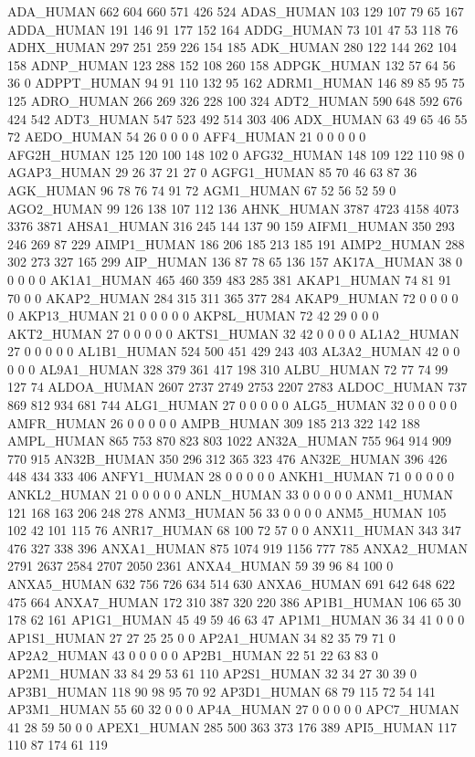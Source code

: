 ADA_HUMAN	662	604	660	571	426	524
ADAS_HUMAN	103	129	107	79	65	167
ADDA_HUMAN	191	146	91	177	152	164
ADDG_HUMAN	73	101	47	53	118	76
ADHX_HUMAN	297	251	259	226	154	185
ADK_HUMAN	280	122	144	262	104	158
ADNP_HUMAN	123	288	152	108	260	158
ADPGK_HUMAN	132	57	64	56	36	0
ADPPT_HUMAN	94	91	110	132	95	162
ADRM1_HUMAN	146	89	85	95	75	125
ADRO_HUMAN	266	269	326	228	100	324
ADT2_HUMAN	590	648	592	676	424	542
ADT3_HUMAN	547	523	492	514	303	406
ADX_HUMAN	63	49	65	46	55	72
AEDO_HUMAN	54	26	0	0	0	0
AFF4_HUMAN	21	0	0	0	0	0
AFG2H_HUMAN	125	120	100	148	102	0
AFG32_HUMAN	148	109	122	110	98	0
AGAP3_HUMAN	29	26	37	21	27	0
AGFG1_HUMAN	85	70	46	63	87	36
AGK_HUMAN	96	78	76	74	91	72
AGM1_HUMAN	67	52	56	52	59	0
AGO2_HUMAN	99	126	138	107	112	136
AHNK_HUMAN	3787	4723	4158	4073	3376	3871
AHSA1_HUMAN	316	245	144	137	90	159
AIFM1_HUMAN	350	293	246	269	87	229
AIMP1_HUMAN	186	206	185	213	185	191
AIMP2_HUMAN	288	302	273	327	165	299
AIP_HUMAN	136	87	78	65	136	157
AK17A_HUMAN	38	0	0	0	0	0
AK1A1_HUMAN	465	460	359	483	285	381
AKAP1_HUMAN	74	81	91	70	0	0
AKAP2_HUMAN	284	315	311	365	377	284
AKAP9_HUMAN	72	0	0	0	0	0
AKP13_HUMAN	21	0	0	0	0	0
AKP8L_HUMAN	72	42	29	0	0	0
AKT2_HUMAN	27	0	0	0	0	0
AKTS1_HUMAN	32	42	0	0	0	0
AL1A2_HUMAN	27	0	0	0	0	0
AL1B1_HUMAN	524	500	451	429	243	403
AL3A2_HUMAN	42	0	0	0	0	0
AL9A1_HUMAN	328	379	361	417	198	310
ALBU_HUMAN	72	77	74	99	127	74
ALDOA_HUMAN	2607	2737	2749	2753	2207	2783
ALDOC_HUMAN	737	869	812	934	681	744
ALG1_HUMAN	27	0	0	0	0	0
ALG5_HUMAN	32	0	0	0	0	0
AMFR_HUMAN	26	0	0	0	0	0
AMPB_HUMAN	309	185	213	322	142	188
AMPL_HUMAN	865	753	870	823	803	1022
AN32A_HUMAN	755	964	914	909	770	915
AN32B_HUMAN	350	296	312	365	323	476
AN32E_HUMAN	396	426	448	434	333	406
ANFY1_HUMAN	28	0	0	0	0	0
ANKH1_HUMAN	71	0	0	0	0	0
ANKL2_HUMAN	21	0	0	0	0	0
ANLN_HUMAN	33	0	0	0	0	0
ANM1_HUMAN	121	168	163	206	248	278
ANM3_HUMAN	56	33	0	0	0	0
ANM5_HUMAN	105	102	42	101	115	76
ANR17_HUMAN	68	100	72	57	0	0
ANX11_HUMAN	343	347	476	327	338	396
ANXA1_HUMAN	875	1074	919	1156	777	785
ANXA2_HUMAN	2791	2637	2584	2707	2050	2361
ANXA4_HUMAN	59	39	96	84	100	0
ANXA5_HUMAN	632	756	726	634	514	630
ANXA6_HUMAN	691	642	648	622	475	664
ANXA7_HUMAN	172	310	387	320	220	386
AP1B1_HUMAN	106	65	30	178	62	161
AP1G1_HUMAN	45	49	59	46	63	47
AP1M1_HUMAN	36	34	41	0	0	0
AP1S1_HUMAN	27	27	25	25	0	0
AP2A1_HUMAN	34	82	35	79	71	0
AP2A2_HUMAN	43	0	0	0	0	0
AP2B1_HUMAN	22	51	22	63	83	0
AP2M1_HUMAN	33	84	29	53	61	110
AP2S1_HUMAN	32	34	27	30	39	0
AP3B1_HUMAN	118	90	98	95	70	92
AP3D1_HUMAN	68	79	115	72	54	141
AP3M1_HUMAN	55	60	32	0	0	0
AP4A_HUMAN	27	0	0	0	0	0
APC7_HUMAN	41	28	59	50	0	0
APEX1_HUMAN	285	500	363	373	176	389
API5_HUMAN	117	110	87	174	61	119

